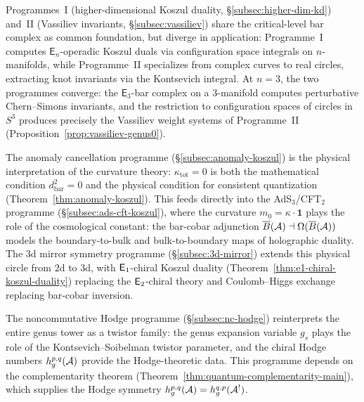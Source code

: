 Programmes~I (higher-dimensional Koszul duality,
\S\ref{subsec:higher-dim-kd}) and~II (Vassiliev invariants,
\S\ref{subsec:vassiliev}) share the critical-level bar complex
as common foundation, but diverge in application: Programme~I
computes $\mathsf{E}_n$-operadic Koszul duals via configuration
space integrals on $n$-manifolds, while Programme~II specializes
from complex curves to real circles, extracting knot invariants via
the Kontsevich integral.  At $n = 3$, the two programmes converge:
the $\mathsf{E}_3$-bar complex on a $3$-manifold computes
perturbative Chern--Simons invariants, and the restriction to
configuration spaces of circles in $S^3$ produces precisely the
Vassiliev weight systems of Programme~II
(Proposition~\ref{prop:vassiliev-genus0}).

The anomaly cancellation programme
(\S\ref{subsec:anomaly-koszul}) is the physical interpretation of
the curvature theory: $\kappa_{\mathrm{tot}} = 0$ is both the
mathematical condition $d_{\mathrm{bar}}^2 = 0$ and the
physical condition for consistent quantization
(Theorem~\ref{thm:anomaly-koszul}).  This feeds directly into the
AdS$_3$/CFT$_2$ programme (\S\ref{subsec:ads-cft-koszul}), where
the curvature $m_0 = \kappa \cdot \mathbf{1}$ plays the role of
the cosmological constant: the bar-cobar adjunction
$\overline{B}(\mathcal{A}) \dashv \Omega(\overline{B}(\mathcal{A}))$ models the
boundary-to-bulk and bulk-to-boundary maps of holographic duality.
The $3$d mirror symmetry programme (\S\ref{subsec:3d-mirror})
extends this physical circle from $2$d to $3$d, with
$\mathsf{E}_1$-chiral Koszul duality
(Theorem~\ref{thm:e1-chiral-koszul-duality}) replacing the
$\mathsf{E}_2$-chiral theory and Coulomb--Higgs exchange replacing
bar-cobar inversion.

The noncommutative Hodge programme (\S\ref{subsec:nc-hodge})
reinterprets the entire genus tower as a twistor family: the
genus expansion variable $g_s$ plays the role of the
Kontsevich--Soibelman twistor parameter, and the chiral Hodge
numbers $h^{p,q}_g(\mathcal{A})$ provide the Hodge-theoretic data.
This programme depends on the complementarity theorem
(Theorem~\ref{thm:quantum-complementarity-main}), which supplies
the Hodge symmetry $h^{p,q}_g(\mathcal{A}) = h^{q,p}_g(\mathcal{A}^!)$.

